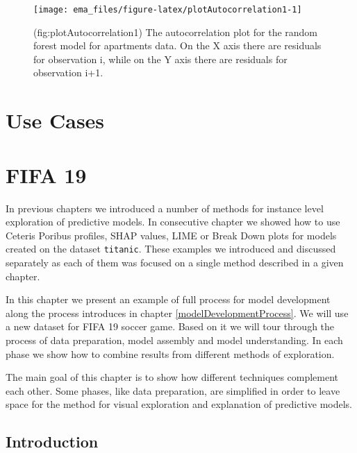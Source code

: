 \documentclass[12pt,]{krantz}
\begin{document}
\begin{figure}

{\centering \texttt{[image: ema\_files/figure-latex/plotAutocorrelation1-1]} 

}

\caption{(fig:plotAutocorrelation1) The autocorrelation plot for the random forest model for apartments data. On the X axis there are residuals for observation i, while on the Y axis there are residuals for observation i+1. }\label{fig:plotAutocorrelation1}
\end{figure}

\hypertarget{use-cases}{%
\section*{Use Cases}\label{use-cases}}

\hypertarget{UseCaseFIFA}{%
\section{FIFA 19}\label{UseCaseFIFA}}

In previous chapters we introduced a number of methods for instance level exploration of predictive models. In consecutive chapter we showed how to use Ceteris Poribus profiles, SHAP values, LIME or Break Down plots for models created on the dataset \texttt{titanic}. These examples we introduced and discussed separately as each of them was focused on a single method described in a given chapter.

In this chapter we present an example of full process for model development along the process introduces in chapter \ref{modelDevelopmentProcess}. We will use a new dataset for FIFA 19 soccer game. Based on it we will tour through the process of data preparation, model assembly and model understanding. In each phase we show how to combine results from different methods of exploration.

The main goal of this chapter is to show how different techniques complement each other. Some phases, like data preparation, are simplified in order to leave space for the method for visual exploration and explanation of predictive models.

\hypertarget{introduction-2}{%
\subsection{Introduction}\label{introduction-2}}
\end{document}
